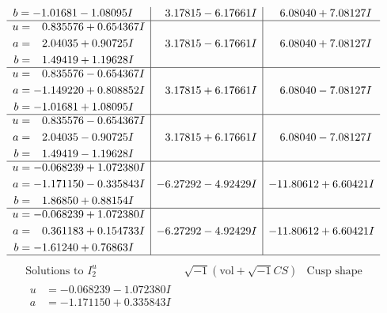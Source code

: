\documentclass[1p]{elsarticle_modified}
\theoremstyle{definition}
\newcommand{\I}{\sqrt{-1}}
\begin{document}
$$\begin{array}{c|c|c}
\begin{aligned}
b &= -1.01681 - 1.08095 I\end{aligned}
 & \phantom{-}3.17815 - 6.17661 I & \phantom{-}6.08040 + 7.08127 I \\ \hline\begin{aligned}
u &= \phantom{-}0.835576 + 0.654367 I \\
a &= \phantom{-}2.04035 + 0.90725 I \\
b &= \phantom{-}1.49419 + 1.19628 I\end{aligned}
 & \phantom{-}3.17815 - 6.17661 I & \phantom{-}6.08040 + 7.08127 I \\ \hline\begin{aligned}
u &= \phantom{-}0.835576 - 0.654367 I \\
a &= -1.149220 + 0.808852 I \\
b &= -1.01681 + 1.08095 I\end{aligned}
 & \phantom{-}3.17815 + 6.17661 I & \phantom{-}6.08040 - 7.08127 I \\ \hline\begin{aligned}
u &= \phantom{-}0.835576 - 0.654367 I \\
a &= \phantom{-}2.04035 - 0.90725 I \\
b &= \phantom{-}1.49419 - 1.19628 I\end{aligned}
 & \phantom{-}3.17815 + 6.17661 I & \phantom{-}6.08040 - 7.08127 I \\ \hline\begin{aligned}
u &= -0.068239 + 1.072380 I \\
a &= -1.171150 - 0.335843 I \\
b &= \phantom{-}1.86850 + 0.88154 I\end{aligned}
 & -6.27292 - 4.92429 I & -11.80612 + 6.60421 I \\ \hline\begin{aligned}
u &= -0.068239 + 1.072380 I \\
a &= \phantom{-}0.361183 + 0.154733 I \\
b &= -1.61240 + 0.76863 I\end{aligned}
 & -6.27292 - 4.92429 I & -11.80612 + 6.60421 I\\
 \hline 
 \end{array}$$\newpage$$\begin{array}{c|c|c}  
\text{Solutions to }I^u_{2}& \I (\text{vol} + \sqrt{-1}CS) & \text{Cusp shape}\\
 \hline 
\begin{aligned}
u &= -0.068239 - 1.072380 I \\
a &= -1.171150 + 0.335843 I \\

\end{aligned}
\end{array}$$
\end{document}
